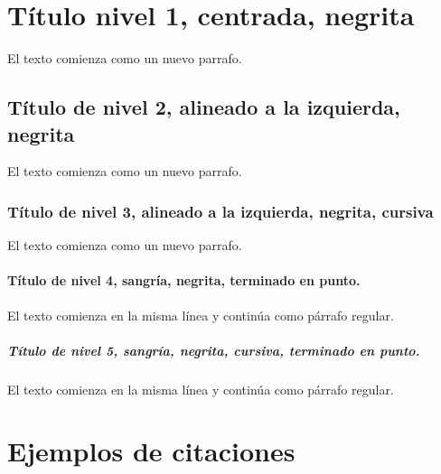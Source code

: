 \section{Título nivel 1, centrada, negrita}
El texto comienza como un nuevo parrafo.

    \subsection{Título de nivel 2, alineado a la izquierda, negrita} 
    El texto comienza como un nuevo parrafo.

        \subsubsection{Título de nivel 3, alineado a la izquierda, negrita, cursiva}
        El texto comienza como un nuevo parrafo.

            \paragraph{Título de nivel 4, sangría, negrita, terminado en punto.} 
            El texto comienza en la misma línea y continúa como párrafo regular.

                \subparagraph{Título de nivel 5, sangría, negrita, cursiva, terminado en punto.} 
                El texto comienza en la misma línea y continúa como párrafo regular.


\section{Ejemplos de citaciones}

\parencite{ArenasFabio} \par
\parencite{BondinAndrea} \par
\parencite{CachadaAna} \par
\parencite{FrandsenJames} \par
\parencite{OtalvaroRogelio} \par